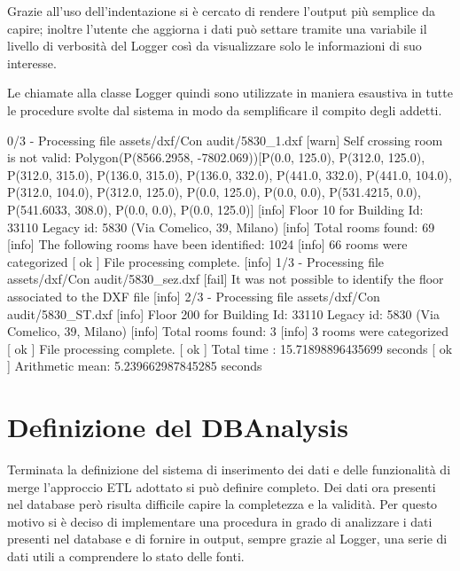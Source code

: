 \documentclass[12pt]{report}
\begin{document}
\vspace{5mm} %

Grazie all'uso dell'indentazione si è cercato di rendere l'output più semplice da capire; inoltre l'utente che aggiorna i dati può settare tramite una variabile il livello di verbosità del Logger così da visualizzare solo le informazioni di suo interesse.

Le chiamate alla classe Logger quindi sono utilizzate in maniera esaustiva in tutte le procedure svolte dal sistema in modo da semplificare il compito degli addetti.

\newpage

\begin{outputl}[title=Esempio di output del Logger nel processamento di file DXF, frame=single]
[info] 0/3 - Processing file assets/dxf/Con audit/5830_1.dxf
       [warn] Self crossing room is not valid: 
       Polygon(P(8566.2958, -7802.069))[P(0.0, 125.0), 
       	P(312.0, 125.0), P(312.0, 315.0), P(136.0, 315.0), 
       	P(136.0, 332.0), P(441.0, 332.0), P(441.0, 104.0), 
       	P(312.0, 104.0), P(312.0, 125.0), P(0.0, 125.0), 
       	P(0.0, 0.0), P(531.4215, 0.0), P(541.6033, 308.0), 
       	P(0.0, 0.0), P(0.0, 125.0)]
       [info] Floor 10 for Building Id: 33110 Legacy id: 
       	5830 (Via Comelico, 39, Milano)
              [info] Total rooms found: 69
              [info] The following rooms have 
              		been identified: 1024
              [info] 66 rooms were categorized
       [ ok ] File processing complete.
[info] 1/3 - Processing file assets/dxf/Con audit/5830_sez.dxf
       [fail] It was not possible to identify the floor 
       	associated to the DXF file
[info] 2/3 - Processing file assets/dxf/Con audit/5830_ST.dxf
       [info] Floor 200 for Building Id: 33110 Legacy id: 
       	5830 (Via Comelico, 39, Milano)
              [info] Total rooms found: 3
              [info] 3 rooms were categorized
       [ ok ] File processing complete.
[ ok ] Total time     : 15.71898896435699 seconds
[ ok ] Arithmetic mean: 5.239662987845285 seconds

\end{outputl}


\newpage
\section{Definizione del DBAnalysis}

Terminata la definizione del sistema di inserimento dei dati e delle funzionalità di merge l'approccio ETL adottato si può definire completo.
Dei dati ora presenti nel database però risulta difficile capire la completezza e la validità.
Per questo motivo si è deciso di implementare una procedura in grado di analizzare i dati presenti nel database e di fornire in output, sempre grazie al Logger, una serie di dati utili a comprendere lo stato delle fonti.
\end{document}
